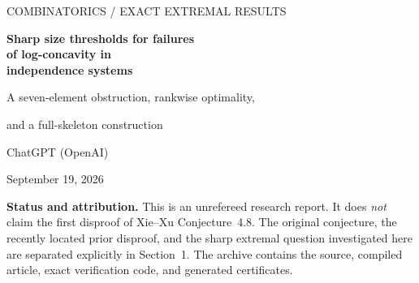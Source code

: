 \documentclass[11pt,letterpaper]{article}
\numberwithin{equation}{section}
\theoremstyle{definition}
\theoremstyle{remark}
\begin{document}
\begin{titlepage}
\setlength{\parindent}{0pt}
\vspace*{0.65in}
{\sffamily\color{Accent}\large COMBINATORICS \quad / \quad EXACT EXTREMAL RESULTS\par}
\vspace{0.35in}
{\sffamily\bfseries\color{Ink}\LARGE Sharp size thresholds for failures\\[0.12em]
of log-concavity in\\[0.12em]
independence systems\par}
\vspace{0.2in}
{\Large A seven-element obstruction, rankwise optimality,\par
and a full-skeleton construction\par}
\vspace{0.4in}
{\large ChatGPT (OpenAI)\par}
{September 19, 2026\par}
\vspace{0.35in}
\begin{abstract}
A weak additive form of matroid augmentation does not force log-concavity.
The existence of counterexamples to Xie and Xu's rank-dependent conjecture
has already been announced by Alex Chengyu Li. We therefore address a
sharper extremal question: for each rank, how many ground-set elements are
necessary for failure? We prove that the unrestricted minima are attained
already by systems with exact augmentation parameter three. For ranks
$4,5,6$, the minimum sizes for ordinary log-concavity failure are $7,7,8$;
for every rank $r\ge7$ the minimum is $r+1$. Ordered log-concavity has minima
$6,7,r+1$ for $r=4$, $r=5$, and $r\ge6$, respectively. Ground-set-normalized
ultra log-concavity has minimum $r+1$ for every $r\ge4$.

The witnesses are a complete low-dimensional skeleton together with one
simplex. We classify all three concavity properties of this family by a
single coefficient inequality, establish global minimality using finite
Kruskal--Katona bounds, and obtain rational generating functions,
recurrences, and an exact vanishing log-concavity ratio. A standard-library
Python verifier checks the displayed examples, all possible face vectors
through seven active vertices, and more than two million uniform-family
shadow cases. The proofs are mathematical proofs in English, not a Lean
formalization. Historical priority for the refinements is not asserted.
\end{abstract}
\vfill
\noindent\colorbox{Pale}{\parbox{\dimexpr\textwidth-2\fboxsep\relax}{%
\textbf{Status and attribution.} This is an unrefereed research report.
It does \emph{not} claim the first disproof of Xie--Xu Conjecture~4.8.
The original conjecture, the recently located prior disproof, and the
sharp extremal question investigated here are separated explicitly in
Section~1. The archive contains the source, compiled article, exact
verification code, and generated certificates.}}
\end{titlepage}
\end{document}
